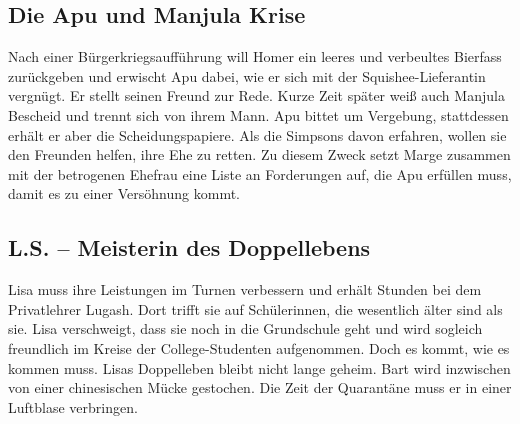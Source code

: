 
\subsection{Die Apu und Manjula Krise}\label{DABF14}
Nach einer Bürgerkriegsaufführung will Homer ein leeres und verbeultes Bierfass zurückgeben und erwischt Apu dabei, wie er sich mit der Squishee-Lieferantin vergnügt. Er stellt seinen Freund zur Rede. Kurze Zeit später weiß auch Manjula Bescheid und trennt sich von ihrem Mann. Apu bittet um Vergebung, stattdessen erhält er aber die Scheidungspapiere. Als die Simpsons davon erfahren, wollen sie den Freunden helfen, ihre Ehe zu retten. Zu diesem Zweck setzt Marge zusammen mit der betrogenen Ehefrau eine Liste an Forderungen auf, die Apu erfüllen muss, damit es zu einer Versöhnung kommt.

	
\subsection{L.S. -- Meisterin des Doppellebens}\label{DABF15}
Lisa muss ihre Leistungen im Turnen verbessern und erhält Stunden bei dem Privatlehrer Lugash. Dort trifft sie auf Schülerinnen, die wesentlich älter sind als sie. Lisa verschweigt, dass sie noch in die Grundschule geht und wird sogleich freundlich im Kreise der College-Studenten aufgenommen. Doch es kommt, wie es kommen muss. Lisas Doppelleben bleibt nicht lange geheim. Bart wird inzwischen von einer chinesischen Mücke gestochen. Die Zeit der Quarantäne muss er in einer Luftblase verbringen.

